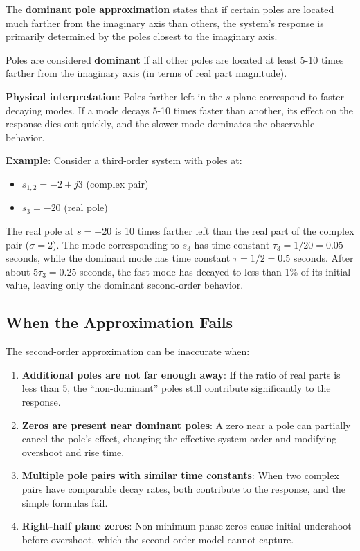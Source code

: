 The \textbf{dominant pole approximation} states that if certain poles are located much farther from the imaginary axis than others, the system's response is primarily determined by the poles closest to the imaginary axis.

\begin{definition}
Poles are considered \textbf{dominant} if all other poles are located at least 5-10 times farther from the imaginary axis (in terms of real part magnitude).
\end{definition}

\textbf{Physical interpretation}: Poles farther left in the $s$-plane correspond to faster decaying modes. If a mode decays 5-10 times faster than another, its effect on the response dies out quickly, and the slower mode dominates the observable behavior.

\textbf{Example}: Consider a third-order system with poles at:
\begin{itemize}
    \item $s_{1,2} = -2 \pm j3$ (complex pair)
    \item $s_3 = -20$ (real pole)
\end{itemize}

The real pole at $s = -20$ is 10 times farther left than the real part of the complex pair ($\sigma = 2$). The mode corresponding to $s_3$ has time constant $\tau_3 = 1/20 = 0.05$ seconds, while the dominant mode has time constant $\tau = 1/2 = 0.5$ seconds. After about $5\tau_3 = 0.25$ seconds, the fast mode has decayed to less than 1\% of its initial value, leaving only the dominant second-order behavior.

\subsection{When the Approximation Fails}

The second-order approximation can be inaccurate when:

\begin{enumerate}
    \item \textbf{Additional poles are not far enough away}: If the ratio of real parts is less than 5, the ``non-dominant'' poles still contribute significantly to the response.

    \item \textbf{Zeros are present near dominant poles}: A zero near a pole can partially cancel the pole's effect, changing the effective system order and modifying overshoot and rise time.

    \item \textbf{Multiple pole pairs with similar time constants}: When two complex pairs have comparable decay rates, both contribute to the response, and the simple formulas fail.

    \item \textbf{Right-half plane zeros}: Non-minimum phase zeros cause initial undershoot before overshoot, which the second-order model cannot capture.
\end{enumerate}

